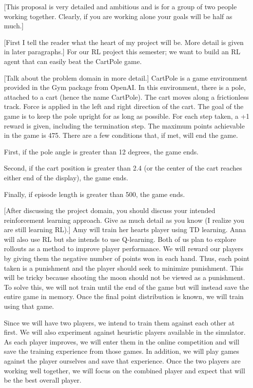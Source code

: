 \documentclass[nohyperref]{article}
\theoremstyle{plain}
\theoremstyle{definition}
\theoremstyle{remark}
\newcommand{\cnote}[1]{\textsf{\color{blue} [#1]}}
\begin{document}

\cnote{This proposal is very detailed and ambitious and is for a group of two people working together.  Clearly, if you are working alone your goals will be half as much.}

\cnote{First I tell the reader what the heart of my project will be.  More detail is given in later paragraphs.}
For our RL project this semester; we want to build an RL agent that can easily beat the CartPole game.  

\cnote{Talk about the problem domain in more detail.}
CartPole is a game environment provided in the Gym package from OpenAI. In this environment, there is a pole, attached to a cart (hence the name CartPole). The cart moves along a frictionless track. Force is applied in the left and right direction of the cart.
The goal of the game is to keep the pole upright for as long as possible. For each step taken, a +1 reward is given, including the termination step. The maximum points achievable in the game is 475. There are a few conditions that, if met, will end the game.

First, if the pole angle is greater than 12 degrees, the game ends.

Second, if the cart position is greater than 2.4 (or the center of the cart reaches either end of the display), the game ends.

Finally, if episode length is greater than 500, the game ends.

\cnote{After discussing the project domain, you should discuss your intended reinforcement learning approach.  Give as much detail as you know (I realize you are still learning RL).}  Amy will train her hearts player using TD learning.  Anna will also use RL but she intends to use Q-learning.  Both of us plan to explore rollouts as a method to improve player performance.   We will reward our players by giving them the negative number of points won in each hand.  Thus, each point taken is a punishment and the player should seek to minimize punishment.  This will be tricky because shooting the moon should not be viewed as a punishment.  To solve this, we will not train until the end of the game but will instead save the entire game in memory.  Once the final point distribution is known, we will train using that game.  

Since we will have two players, we intend to train them against each other at first.  We will also experiment against heuristic players available in the simulator.  As each player improves, we will enter them in the online competition and will save the training experience from those games.  In addition, we will play games against the player ourselves and save that experience.  Once the two players are working well together, we will focus on the combined player and expect that will be the best overall player.
\end{document}
